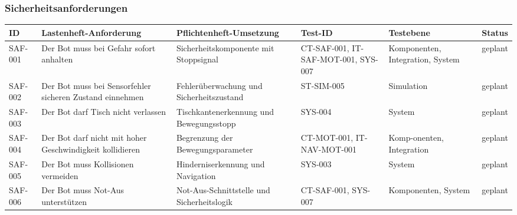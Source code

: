 \documentclass[
  a4paper,
  12pt,
  DIV=12,        %
  parskip=half,  %
  headings=small %
]{scrartcl}
\theoremstyle{definition}
\theoremstyle{definition}
\begin{document}
\newpage

\begin{landscape}
\subsubsection{Sicherheitsanforderungen}\label{sicherheitsanforderungen}

\begin{longtable}[]{@{}
  >{\raggedright\arraybackslash}p{}
  >{\raggedright\arraybackslash}p{}
  >{\raggedright\arraybackslash}p{}
  >{\raggedright\arraybackslash}p{}
  >{\raggedright\arraybackslash}p{}
  >{\raggedright\arraybackslash}p{}@{}}
\toprule\noalign{}
\begin{minipage}[b]{\linewidth}\raggedright
ID
\end{minipage} & \begin{minipage}[b]{\linewidth}\raggedright
Lastenheft-Anforderung
\end{minipage} & \begin{minipage}[b]{\linewidth}\raggedright
Pflichtenheft-Umsetzung
\end{minipage} & \begin{minipage}[b]{\linewidth}\raggedright
Test-ID
\end{minipage} & \begin{minipage}[b]{\linewidth}\raggedright
Testebene
\end{minipage} & \begin{minipage}[b]{\linewidth}\raggedright
Status
\end{minipage} \\
\midrule\noalign{}
\endhead
\bottomrule\noalign{}
\endlastfoot
SAF-001 & Der Bot muss bei Gefahr sofort anhalten &
Sicherheitskomponente mit Stoppsignal & CT-SAF-001, IT-SAF-MOT-001,
SYS-007 & Komponenten, Integration, System & geplant \\
SAF-002 & Der Bot muss bei Sensorfehler sicheren Zustand einnehmen &
Fehlerüberwachung und Sicherheitszustand & ST-SIM-005 & Simulation &
geplant \\
SAF-003 & Der Bot darf Tisch nicht verlassen & Tischkantenerkennung und
Bewegungsstopp & SYS-004 & System & geplant \\
SAF-004 & Der Bot darf nicht mit hoher Geschwindigkeit kollidieren &
Begrenzung der Bewegungsparameter & CT-MOT-001, IT-NAV-MOT-001 &
Komp-onenten, Integration & geplant \\
SAF-005 & Der Bot muss Kollisionen vermeiden & Hinderniserkennung und
Navigation & SYS-003 & System & geplant \\
SAF-006 & Der Bot muss Not-Aus unterstützen & Not-Aus-Schnittstelle und
Sicherheitslogik & CT-SAF-001, SYS-007 & Komponenten, System &
geplant \\
\end{longtable}
\end{landscape}
\end{document}

